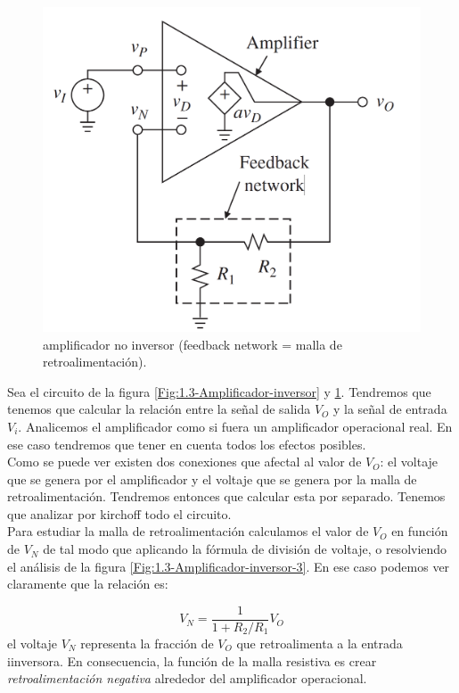 \documentclass[12pt,a4paper]{article}
\numberwithin{equation}{section}
\numberwithin{figure}{section}
\begin{document}
\begin{figure}[h!] \centering
\includegraphics[scale=0.3]{1.3-Amplificador-inversor-2.png}
\caption{amplificador no inversor (feedback network = malla de retroalimentación).}
\label{Fig:1.3-Amplificador-inversor-2}
\end{figure}


Sea el circuito de la figura \ref{Fig:1.3-Amplificador-inversor} y \ref{Fig:1.3-Amplificador-inversor-2}. Tendremos que tenemos que calcular la relación entre la señal de salida $V_O$ y la señal de entrada $V_i$. Analicemos el amplificador como si fuera un amplificador operacional real. En ese caso tendremos que tener en cuenta todos los efectos posibles. \\

Como se puede ver existen dos conexiones que afectal al valor de $V_O$: el voltaje que se genera por el amplificador y el voltaje que se genera por la malla de retroalimentación. Tendremos entonces que calcular esta por separado. Tenemos que analizar por kirchoff todo el circuito. \\

Para estudiar la malla de retroalimentación calculamos el valor de $V_O$ en función de $V_N$ de tal modo que aplicando la fórmula de división de voltaje, o resolviendo el análisis de la figura \ref{Fig:1.3-Amplificador-inversor-3}. En ese caso podemos ver claramente que la relación es:

\begin{equation}
V_N = \dfrac{1}{1+R_2/R_1} V_O
\end{equation}
el voltaje $V_N$ representa la fracción de $V_O$ que retroalimenta a la entrada iinversora. En consecuencia, la función de la malla resistiva es crear \textit{retroalimentación negativa} alrededor del amplificador operacional. \\
\end{document}
